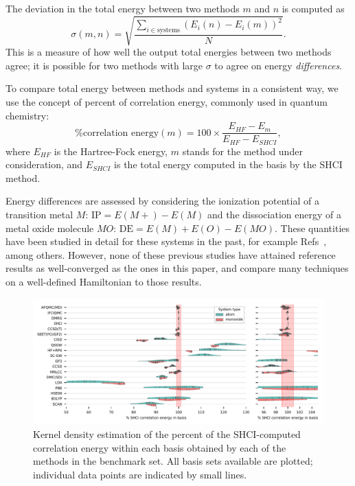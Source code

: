The deviation in the total energy between two methods $m$ and $n$ is computed as
\begin{equation}
    \sigma(m,n) = \sqrt{\frac{\sum_{i \in \text{systems} } (E_i(n)-E_i(m))^2}{N}}.
    \label{eqn:rms}
\end{equation}
This is a measure of how well the output total energies between two methods agree; it is possible for two methods with large $\sigma$ to agree on energy \textit{differences}. 

To compare total energy between methods and systems in a consistent way, we use the concept of percent of correlation energy, commonly used in quantum chemistry:
\begin{equation}
    \text{\% correlation energy}(m) = 100 \times \frac{E_{HF} - E_{m}}{E_{HF}-E_{SHCI}},
    \label{eqn:correlation_energy}
\end{equation}
where $E_{HF}$ is the Hartree-Fock energy, $m$ stands for the method under consideration, and $E_{SHCI}$ is the total energy computed in the basis by the SHCI method.

Energy differences are assessed by considering the ionization potential of a transition metal $M$: $\text{IP}=E(M+) - E(M)$ and the dissociation energy of a metal oxide molecule $MO$: $\text{DE}=E(M)+E(O)-E(MO)$.
These quantities have been studied in detail for these systems in the past, for example Refs~\cite{bauschlicher_theoretical_1995,furche_performance_2006,doblhoff-dier_diffusion_2016,verma_assessment_2017,xu_practical_2015,bligaard_toward_2016,mardirossian_thirty_2017,minenkov_troubles_2016,thomas_accurate_2015,tew_explicitly_2016,johnson_communication:_2017}, among others. 
However, none of these previous studies have attained reference results as well-converged as the ones in this paper, and compare many techniques on a well-defined Hamiltonian to those results.


\begin{figure}
\begin{center}
\includegraphics[width=\linewidth]{figs/correlation_energybar}
\caption{Kernel density estimation of the percent of the SHCI-computed correlation energy within each basis obtained by each of the methods in the benchmark set.
All basis sets available are plotted; individual data points are indicated by small lines.}\label{fig:correlation_energy}
\end{center}
\end{figure}

